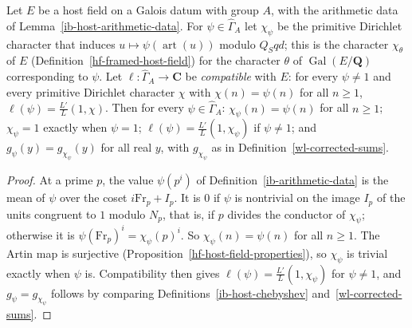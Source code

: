 \begin{lemma}\label{ib-host-character-values}
Let $E$ be a host field on a Galois datum with group $A$, with the arithmetic data of
Lemma~\ref{ib-host-arithmetic-data}. For $\psi\in\widehat\Gamma_A$ let
$\chi_\psi$ be the primitive Dirichlet character that induces
$u\mapsto\psi(\operatorname{art}(u))$ modulo $Q_Sqd$; this is the character
$\chi_\theta$ of $E$ (Definition~\ref{hf-framed-host-field}) for the character
$\theta$ of $\operatorname{Gal}(E/\mathbf Q)$ corresponding to $\psi$. Let
$\ell:\widehat\Gamma_A\to\mathbf C$ be \emph{compatible} with $E$: for every
$\psi\neq1$ and every primitive Dirichlet character $\chi$ with $\chi(n)=\psi(n)$
for all $n\geq1$, $\ell(\psi)=\frac{L'}{L}(1,\chi)$. Then for every
$\psi\in\widehat\Gamma_A$: $\chi_\psi(n)=\psi(n)$ for all $n\geq1$;
$\chi_\psi=1$ exactly when $\psi=1$; $\ell(\psi)=\frac{L'}{L}(1,\chi_\psi)$ if
$\psi\neq1$; and $g_\psi(y)=g_{\chi_\psi}(y)$ for all real $y$, with
$g_{\chi_\psi}$ as in Definition~\ref{wl-corrected-sums}.
\end{lemma}
\begin{proof}
At a prime $p$, the value $\psi(p^i)$ of Definition~\ref{ib-arithmetic-data} is
the mean of $\psi$ over the coset $i\mathrm{Fr}_p+I_p$. It is $0$ if $\psi$ is
nontrivial on the image $I_p$ of the units congruent to $1$ modulo $N_p$, that is,
if $p$ divides the conductor of $\chi_\psi$; otherwise it is
$\psi(\mathrm{Fr}_p)^i=\chi_\psi(p)^i$. So $\chi_\psi(n)=\psi(n)$ for all $n\geq1$.
The Artin map is surjective (Proposition~\ref{hf-host-field-properties}), so
$\chi_\psi$ is trivial exactly when $\psi$ is.
Compatibility then gives $\ell(\psi)=\frac{L'}{L}(1,\chi_\psi)$ for $\psi\neq1$,
and $g_\psi=g_{\chi_\psi}$ follows by comparing
Definitions~\ref{ib-host-chebyshev} and~\ref{wl-corrected-sums}.
\end{proof}

